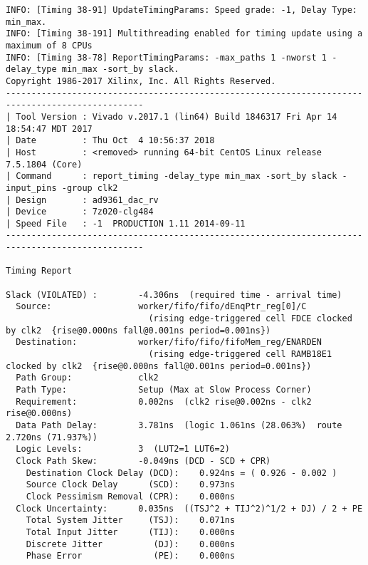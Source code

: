 \begin{lstlisting}
INFO: [Timing 38-91] UpdateTimingParams: Speed grade: -1, Delay Type: min_max.
INFO: [Timing 38-191] Multithreading enabled for timing update using a maximum of 8 CPUs
INFO: [Timing 38-78] ReportTimingParams: -max_paths 1 -nworst 1 -delay_type min_max -sort_by slack.
Copyright 1986-2017 Xilinx, Inc. All Rights Reserved.
-------------------------------------------------------------------------------------------------
| Tool Version : Vivado v.2017.1 (lin64) Build 1846317 Fri Apr 14 18:54:47 MDT 2017
| Date         : Thu Oct  4 10:56:37 2018
| Host         : <removed> running 64-bit CentOS Linux release 7.5.1804 (Core)
| Command      : report_timing -delay_type min_max -sort_by slack -input_pins -group clk2
| Design       : ad9361_dac_rv
| Device       : 7z020-clg484
| Speed File   : -1  PRODUCTION 1.11 2014-09-11
-------------------------------------------------------------------------------------------------

Timing Report

Slack (VIOLATED) :        -4.306ns  (required time - arrival time)
  Source:                 worker/fifo/fifo/dEnqPtr_reg[0]/C
                            (rising edge-triggered cell FDCE clocked by clk2  {rise@0.000ns fall@0.001ns period=0.001ns})
  Destination:            worker/fifo/fifo/fifoMem_reg/ENARDEN
                            (rising edge-triggered cell RAMB18E1 clocked by clk2  {rise@0.000ns fall@0.001ns period=0.001ns})
  Path Group:             clk2
  Path Type:              Setup (Max at Slow Process Corner)
  Requirement:            0.002ns  (clk2 rise@0.002ns - clk2 rise@0.000ns)
  Data Path Delay:        3.781ns  (logic 1.061ns (28.063%)  route 2.720ns (71.937%))
  Logic Levels:           3  (LUT2=1 LUT6=2)
  Clock Path Skew:        -0.049ns (DCD - SCD + CPR)
    Destination Clock Delay (DCD):    0.924ns = ( 0.926 - 0.002 )
    Source Clock Delay      (SCD):    0.973ns
    Clock Pessimism Removal (CPR):    0.000ns
  Clock Uncertainty:      0.035ns  ((TSJ^2 + TIJ^2)^1/2 + DJ) / 2 + PE
    Total System Jitter     (TSJ):    0.071ns
    Total Input Jitter      (TIJ):    0.000ns
    Discrete Jitter          (DJ):    0.000ns
    Phase Error              (PE):    0.000ns


\end{lstlisting}
